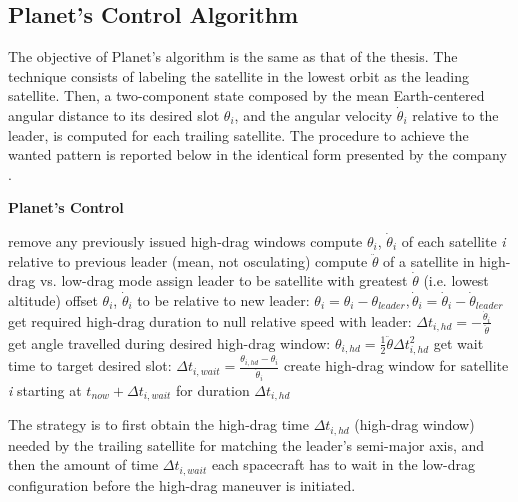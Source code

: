 \subsection{Planet's Control Algorithm} \label{planet_algorithm_par}
The objective of Planet's algorithm is the same as that of the thesis.
The technique consists of labeling the satellite in the lowest orbit as the leading satellite.
Then, a two-component state composed by the mean Earth-centered angular distance to its desired slot $\theta_i$, and the angular velocity $\dot{\theta}_i$ relative to the leader, is computed for each trailing satellite.
The procedure to achieve the wanted pattern is reported below in the identical form presented by the company \cite{foster2015orbit}.

\begin{algorithm}[H]
      \caption{\textbf{Planet's Control}}
      \begin{algorithmic}[1]
                  \State remove any previously issued high-drag windows
                  \State compute $\theta_i$, $\dot{\theta}_i$ of each satellite \textit{i} relative to previous leader (mean, not osculating)
                  \State compute $\ddot{\theta}$ of a satellite in high-drag vs. low-drag mode
                  \State assign leader to be satellite with greatest $\dot{\theta}$ (i.e. lowest altitude)
                        \State offset $\theta_i$, $\dot{\theta}_i$ to be relative to new leader: $\theta_i = \theta_i - \theta_{leader}, \dot{\theta}_i = \dot{\theta}_i - \dot{\theta}_{leader}$
                        \State get required high-drag duration to null relative speed with leader: $\Delta t_{i,hd} = - \frac{\dot{\theta}_i}{\ddot{\theta}}$
                        \State get angle travelled during desired high-drag window: $\theta_{i,hd} = \frac{1}{2} \ddot{\theta} \Delta t_{i,hd}^2$
                        \State get wait time to target desired slot: $\Delta t_{i,wait} = \frac{\theta_{i,hd} - \theta_i}{\dot{\theta}_i}$
                        \State create high-drag window for satellite \textit{i} starting at $t_{now} + \Delta t_{i,wait}$ for duration $\Delta t_{i,hd}$
                  \EndFor
            \EndProcedure
      \end{algorithmic}
\end{algorithm}

The strategy is to first obtain the high-drag time $\Delta t_{i,hd}$ (high-drag window) needed by the trailing satellite for matching the leader's semi-major axis, and then the amount of time $\Delta t_{i,wait}$ each spacecraft has to wait in the low-drag configuration before the high-drag maneuver is initiated.


